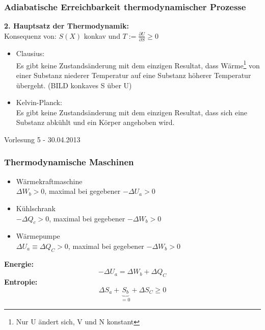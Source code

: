 \documentclass[10pt]{scrartcl}
\begin{document}
\begin{fleqn}
\subsubsection{Adiabatische Erreichbarkeit thermodynamischer Prozesse}
\textbf{2. Hauptsatz der Thermodynamik:}\\
Konsequenz von: $S(X)$ konkav und $T:=\frac{\partial U}{\partial S} \geq 0$\\
\begin{itemize}
  \item Clausius:\\
  Es gibt keine Zustandsänderung mit dem einzigen Resultat, dass Wärme\footnote{Nur U ändert sich, V und N konstant} von einer Substanz niederer Temperatur auf eine Substanz höherer Temperatur übergeht. (BILD konkaves S über U)
  \item Kelvin-Planck:\\
  Es gibt keine Zustandsänderung mit dem einzigen Resultat, dass sich eine Substanz abkühlt und ein Körper angehoben wird.
\end{itemize}


\begin{flushright}
Vorlesung 5 - 30.04.2013
\end{flushright}
\subsubsection{Thermodynamische Maschinen}
\begin{itemize}
	\item Wärmekraftmaschine\\
    $\Delta W_b >0$, maximal bei gegebener $-\Delta U_a>0$
  \item Kühlschrank\\
    $-\Delta Q_c >0$, maximal bei gegebener $-\Delta W_b>0$
  \item Wärmepumpe\\
    $\Delta U_a \equiv \Delta Q_C >0$, maximal bei gegebener $-\Delta W_b >0$
\end{itemize}
\textbf{Energie:}
\begin{equation}
-\Delta U_a = \Delta W_b + \Delta Q_C
\end{equation}
\textbf{Entropie:}
\begin{equation}
\Delta S_a +\underbrace{S_b}_{=0}+ \Delta S_C \geq 0
\end{equation}


\end{fleqn}
\end{document}

